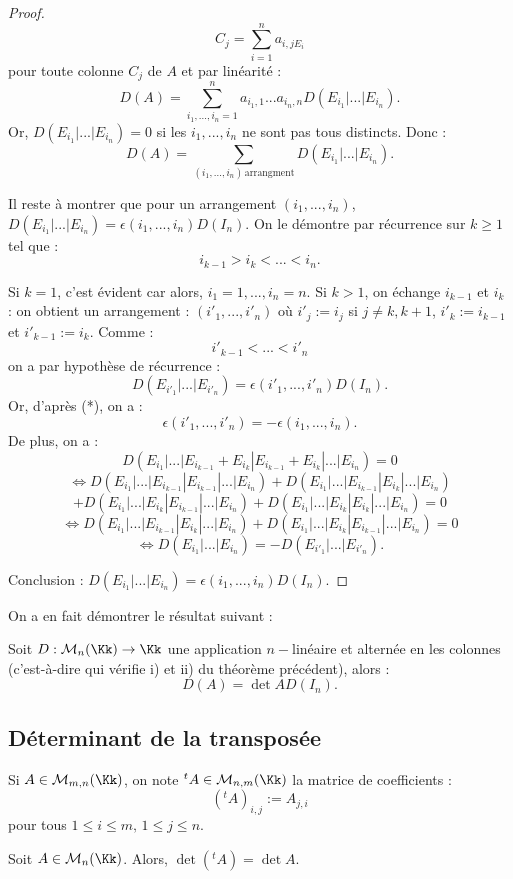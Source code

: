 \documentclass[class=report,crop=false]{standalone}
\begin{document}
\begin{proof}
\[C_j = \sum_{i=1}^n a_{i,j E_i}\]
pour toute colonne $C_j$ de $A$ et par linéarité :
\[D(A) = \sum_{i_1,...,i_n = 1}^n a_{i_1,1}...a_{i_n,n}D(E_{i_1}|...|E_{i_n}) .\]
Or, $D(E_{i_1}|...|E_{i_n}) = 0$ si les $i_1,...,i_n$ ne sont pas tous distincts. Donc :
\[D(A) =  \sum_{(i_1,...,i_n)\mathrm{\, arrangment}} D(E_{i_1}|...|E_{i_n}) .\]

Il reste à montrer que pour un arrangement $(i_1,...,i_n)$, $D(E_{i_1}|...|E_{i_n}) = \epsilon(i_1,...,i_n)D(I_n)$. On le démontre par récurrence  sur $k \ge 1$ tel que :
\[i_{k-1}>  i_k< ...<i_n.\]

Si $k=1$, c'est évident car alors, $i_1=1,...,i_n=n$. Si $k >1$, on échange $i_{k-1}$ et $i_k$ : on obtient un arrangement :
$(i'_1,...,i'_n)$ où $i'_j:=i_j$ si $j \neq k,k+1$, $i'_k:= i_{k-1}$ et $i'_{k-1}:=i_k$. Comme :
\[i'_{k-1}<...<i'_n\]
on a par hypothèse de récurrence :
\[D(E_{i'_1}|...|E_{i'_n}) = \epsilon(i'_1,...,i'_n) D(I_n).\]
Or, d'après  (*), on a :
\[\epsilon(i'_1,...,i'_n) = - \epsilon(i_1,...,i_n) .\]
De plus, on a :
\[D(E_{i_1}|...|E_{i_{k-1}}+E_{i_k}|E_{i_{k-1}}+E_{i_k}|...| E_{i_n}) = 0\]
\[\iff D(E_{i_1}|...|E_{i_{k-1}}|E_{i_{k-1}}|...| E_{i_n}) + D(E_{i_1}|...|E_{i_{k-1}}|E_{i_{k}}|...| E_{i_n}) \]
\[+ D(E_{i_1}|...|E_{i_k}|E_{i_{k-1}}|...| E_{i_n}) + D(E_{i_1}|...|E_{i_k}|E_{i_k}|...| E_{i_n}) = 0\]
\[ \iff D(E_{i_1}|...|E_{i_{k-1}}|E_{i_{k}}|...| E_{i_n}) + D(E_{i_1}|...|E_{i_k}|E_{i_{k-1}}|...| E_{i_n}) =0\]
\[\iff D(E_{i_1}|...|E_{i_n}) = -D(E_{i'_1}|...|E_{i'_n}) .\]

Conclusion : $D(E_{i_1}|...|E_{i_n}) = \epsilon(i_1,...,i_n)D(I_n)$.
\end{proof}

On a en fait démontrer le résultat suivant :
\begin{theoreme}\label{th:det2}
Soit $D: \mathcal{M}_n(\Kk) \to \Kk$ une application $n-$linéaire et alternée en les colonnes (c'est-à-dire qui vérifie i) et ii) du théorème précédent), alors : \[D(A) = \det A D(I_n).\]
\end{theoreme}

\subsection*{Déterminant de la transposée}

Si $A \in \mathcal{M}_{m,n}(\Kk)$, on note ${}^tA \in \mathcal{M}_{n,m}(\Kk)$ la matrice de coefficients :
\[({}^tA)_{i,j} := A_{j,i}\]
pour tous $1 \le i \le m,\,1 \le j \le n$.

\begin{theoreme}
Soit $A \in \mathcal{M}_n(\Kk)$. Alors, $\det ({}^tA) = \det A$.
\end{theoreme}
\end{document}
